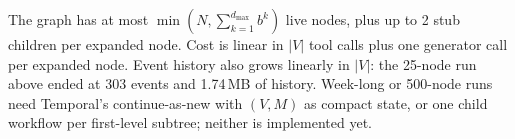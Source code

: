 The graph has at most $\min(N,\sum_{k=1}^{d_{\max}} b^k)$ live nodes, plus up to 2 stub children per expanded node. Cost is linear in $|V|$ tool calls plus one generator call per expanded node. Event history also grows linearly in $|V|$: the 25-node run above ended at 303 events and 1.74\,MB of history. Week-long or 500-node runs need Temporal's continue-as-new with $(V,M)$ as compact state, or one child workflow per first-level subtree; neither is implemented yet.
